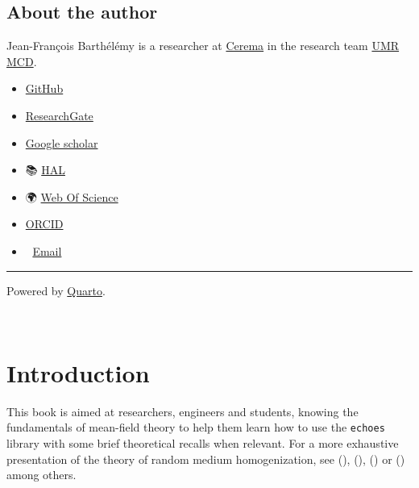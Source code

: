 \documentclass[
  a4paper,
  numbers=noendperiod,
  DIV=12]{scrreprt}
\begin{document}
\section*{About the author}\label{about-the-author}


Jean-François Barthélémy is a researcher at
\href{https://www.cerema.fr/en}{Cerema} in the research team
\href{https://www.cerema.fr/fr/presse/dossier\%20cerema-universite-gustave-eiffel-creent-unite-mixte}{UMR
MCD}.

\begin{itemize}
\item
  \href{https://github.com/jfbarthelemy}{GitHub}
\item

  \href{https://www.researchgate.net/profile/Jean-Francois_Barthelemy}{ResearchGate}
\item

  \href{https://scholar.google.com/citations?user=RVjtCiAAAAAJ&hl=en}{Google
  scholar}
\item
  📚
  \href{https://hal.archives-ouvertes.fr/search/index/?q=\%2A&authIdHal_s=jfbarthelemy}{HAL}
\item
  🌍 \href{https://www.webofscience.com/wos/author/record/449919}{Web Of
  Science}
\item
  \href{https://orcid.org/0000-0002-1968-8939}{ORCID}
\item
  📩 \href{mailto:jf.barthelemy@cerema.fr}{Email}
\end{itemize}

\begin{center}\rule{0.5\linewidth}{0.5pt}\end{center}

Powered by \href{https://quarto.org/}{Quarto}.

\(\,\)


\chapter*{Introduction}\label{sec-intro}


This book is aimed at researchers, engineers and students, knowing the
fundamentals of mean-field theory to help them learn how to use the
\texttt{echoes} library with some brief theoretical recalls when
relevant. For a more exhaustive presentation of the theory of random
medium homogenization, see (), (),
() or
() among
others.
\end{document}
